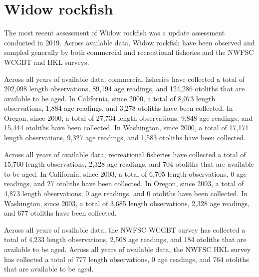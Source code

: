 \documentclass[11pt,
  english,
  letterpaper,
]{article}
\begin{document}

\hypertarget{widow-rockfish}{%
\section{Widow rockfish}\label{widow-rockfish}}

\leavevmode\tagmcend\tagstructend


The most recent assessment of Widow rockfish was a update assessment conducted in 2019. Across available data, Widow rockfish have been observed and sampled generally by both commercial and recreational fisheries and the NWFSC WCGBT and HKL surveys.

\leavevmode\tagmcend\tagstructend\par


Across all years of available data, commercial fisheries have collected a total of 202,098 length observations, 89,194 age readings, and 124,286 otoliths that are available to be aged. In California, since 2000, a total of 8,073 length observations, 1,884 age readings, and 3,278 otoliths have been collected. In Oregon, since 2000, a total of 27,734 length observations, 9,848 age readings, and 15,444 otoliths have been collected. In Washington, since 2000, a total of 17,171 length observations, 9,327 age readings, and 1,583 otoliths have been collected.

\leavevmode\tagmcend\tagstructend\par


Across all years of available data, recreational fisheries have collected a total of 15,760 length observations, 2,328 age readings, and 704 otoliths that are available to be aged. In California, since 2003, a total of 6,705 length observations, 0 age readings, and 27 otoliths have been collected. In Oregon, since 2003, a total of 4,873 length observations, 0 age readings, and 0 otoliths have been collected. In Washington, since 2003, a total of 3,685 length observations, 2,328 age readings, and 677 otoliths have been collected.

\leavevmode\tagmcend\tagstructend\par


Across all years of available data, the NWFSC WCGBT survey has collected a total of 4,233 length observations, 2,508 age readings, and 184 otoliths that are available to be aged. Across all years of available data, the NWFSC HKL survey has collected a total of 777 length observations, 0 age readings, and 764 otoliths that are available to be aged.
\end{document}
